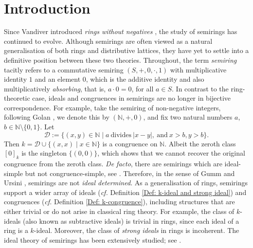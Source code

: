 \documentclass[11pt,leqno]{amsart}
\theoremstyle{definition}
\numberwithin{equation}{section}
\begin{document}
\section{Introduction} 
Since Vandiver introduced \emph{rings without negatives} \cite{Vandiver34, Vandiver39}, the study of semirings has continued to evolve. Although semirings are often viewed as a natural generalisation of both rings and distributive lattices, they have yet to settle into a definitive position between these two theories.
Throughout, the term \emph{semiring} tacitly refers to a commutative semiring $(S,+,0,\cdot,1)$ with multiplicative identity $1$ and an element $0$, which is the additive identity and also multiplicatively \emph{absorbing}, that is, $a\cdot 0=0$, for all $a\in S$. 
In contrast to the ring-theoretic case, ideals and congruences in semirings are no longer in bijective correspondence. For example, take the semiring of non-negative integers, following Golan \cite{Golan}, we denote this by $(\mathds{N},+,0)$, and fix two natural numbers $a$, $b\in \mathds{N}\setminus \{0,1\}$.
Let $$\mathcal{D}:=\{(x,y)\in \mathds{N}\mid a\ \text{divides}\ |x-y|,\ \text{and}\ x>b,y>b\}.$$ Then $k=\mathcal{D}\cup \{(x,x)\mid x\in \mathds{N}\}$ is a congruence on $\mathds{N}$. Albeit the zeroth class $[0]_k$ is the singleton $\{(0,0)\}$, which shows that we cannot recover the original congruence from the zeroth class. \emph{De facto}, there are semirings which are ideal-simple but not congruence-simple, see \cite[Section 2]{Nam21}.  Therefore, in the sense of Gumm and Ursini \cite{GummUrsini}, semirings are not \emph{ideal determined}. As a generalisation of rings, semirings support a wider array of ideals (\textit{cf.} Definition \ref{Def: k-ideal and strong ideal}) and congruences (\textit{cf.} Definition \ref{Def: k-congruence}), including structures that are either trivial or do not arise in classical ring theory. For example, the class of $k$-ideals (also known as subtractive ideals) is trivial in rings, since each ideal of a ring is a $k$-ideal. Moreover, the class of \emph{strong ideals} in rings is incoherent. The ideal theory of semirings has been extensively studied; see \cite{Atani08, AtaniGarfami13, Nasehpour19, Iseki56, LaGrassa95, Goswami23, Goswami25, GoswamiDube24, GoswamiMaatallah25, BiswasBagSardarFilomat24}.
\end{document}
